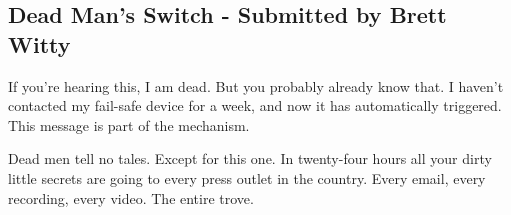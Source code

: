 \documentclass[12pt, a5paper, parskip=half-]{scrartcl}
\begin{document}
%
%
%
%
%
%

\subsection*{Dead Man's Switch  \setmainfont{URWClassico} - Submitted by Brett Witty} \label{subsection:dead-mans-switch}
If you're hearing this, I am dead.
But you probably already know that.
I haven't contacted my fail-safe device for a week, and now it has automatically triggered.
This message is part of the mechanism.

Dead men tell no tales.
Except for this one. 
In twenty-four hours all your dirty little secrets are going to every press outlet in the country. 
Every email, every recording, every video. 
The entire trove.
\end{document}
